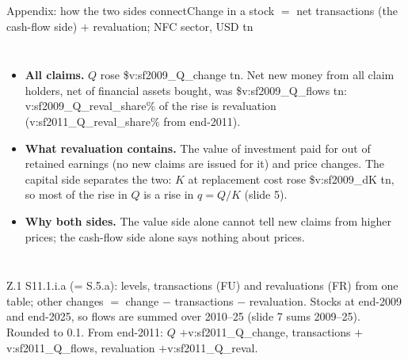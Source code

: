 \documentclass[aspectratio=169,10pt,t]{beamer}
\newcommand{\val}[1]{\csname v:#1\endcsname}
\newcommand{\src}[1]{\vfill{\tiny\textcolor{muted}{#1}\par}\vspace{0.1cm}}
\begin{document}
\begin{frame}[label=xlink]{Appendix: how the two sides connect}{Change in a stock $=$ net transactions (the cash-flow side) $+$ revaluation; NFC sector, USD tn}
\begin{columns}[T]
{\begin{itemize}
\item \textbf{All claims.} $Q$ rose \$\val{sf2009_Q_change} tn. Net new money from all claim holders, net of financial assets bought, was \$\val{sf2009_Q_flows} tn: \val{sf2009_Q_reval_share}\% of the rise is revaluation (\val{sf2011_Q_reval_share}\% from end-2011).
\item \textbf{What revaluation contains.} The value of investment paid for out of retained earnings (no new claims are issued for it) and price changes. The capital side separates the two: $K$ at replacement cost rose \$\val{sf2009_dK} tn, so most of the rise in $Q$ is a rise in $q=Q/K$ (slide 5).
\item \textbf{Why both sides.} The value side alone cannot tell new claims from higher prices; the cash-flow side alone says nothing about prices.
\end{itemize}}
\end{columns}
\src{Z.1 S11.1.i.a (= S.5.a): levels, transactions (FU) and revaluations (FR) from one table; other changes $=$ change $-$ transactions $-$ revaluation. Stocks at end-2009 and end-2025, so flows are summed over 2010--25 (slide 7 sums 2009--25). Rounded to 0.1. From end-2011: $Q$ $+$\val{sf2011_Q_change}, transactions $+$\val{sf2011_Q_flows}, revaluation $+$\val{sf2011_Q_reval}.}
\end{frame}
\end{document}
